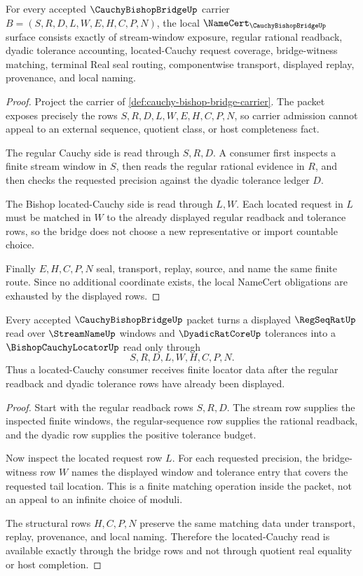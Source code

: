 \begin{theorem}
\label{thm:cauchy-bishop-bridge-namecert-obligations}
For every accepted $\CauchyBishopBridgeUp$ carrier $B=(S,R,D,L,W,E,H,C,P,N)$, the local $\NameCert_{\CauchyBishopBridgeUp}$ surface consists exactly of stream-window exposure, regular rational readback, dyadic tolerance accounting, located-Cauchy request coverage, bridge-witness matching, terminal Real seal routing, componentwise transport, displayed replay, provenance, and local naming.
\end{theorem}
\begin{proof}
Project the carrier of \autoref{def:cauchy-bishop-bridge-carrier}. The packet exposes precisely the rows $S,R,D,L,W,E,H,C,P,N$, so carrier admission cannot appeal to an external sequence, quotient class, or host completeness fact.

The regular Cauchy side is read through $S,R,D$. A consumer first inspects a finite stream window in $S$, then reads the regular rational evidence in $R$, and then checks the requested precision against the dyadic tolerance ledger $D$.

The Bishop located-Cauchy side is read through $L,W$. Each located request in $L$ must be matched in $W$ to the already displayed regular readback and tolerance rows, so the bridge does not choose a new representative or import countable choice.

Finally $E,H,C,P,N$ seal, transport, replay, source, and name the same finite route. Since no additional coordinate exists, the local NameCert obligations are exhausted by the displayed rows.
\end{proof}

\begin{theorem}
\label{thm:cauchy-bishop-bridge-regular-readback}
Every accepted $\CauchyBishopBridgeUp$ packet turns a displayed $\RegSeqRatUp$ read over $\StreamNameUp$ windows and $\DyadicRatCoreUp$ tolerances into a $\BishopCauchyLocatorUp$ read only through
$$
S,R,D,L,W,H,C,P,N.
$$
Thus a located-Cauchy consumer receives finite locator data after the regular readback and dyadic tolerance rows have already been displayed.
\end{theorem}
\begin{proof}
Start with the regular readback rows $S,R,D$. The stream row supplies the inspected finite windows, the regular-sequence row supplies the rational readback, and the dyadic row supplies the positive tolerance budget.

Now inspect the located request row $L$. For each requested precision, the bridge-witness row $W$ names the displayed window and tolerance entry that covers the requested tail location. This is a finite matching operation inside the packet, not an appeal to an infinite choice of moduli.

The structural rows $H,C,P,N$ preserve the same matching data under transport, replay, provenance, and local naming. Therefore the located-Cauchy read is available exactly through the bridge rows and not through quotient real equality or host completion.
\end{proof}

